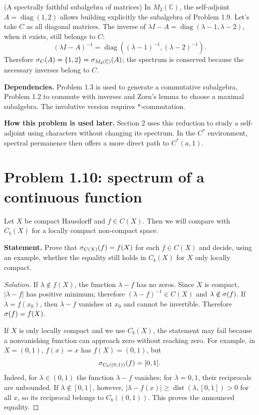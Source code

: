 \begin{cthejemplo}{(A spectrally faithful subalgebra of matrices)}
In $M_2(\mathbb C)$, the self-adjoint $A=\operatorname{diag}(1,2)$ allows building
explicitly the subalgebra of Problem 1.9.
Let's take $C$ as all diagonal matrices. The inverse of
$\lambda I-A=\operatorname{diag}(\lambda-1,\lambda-2)$, when it exists, still belongs to $C$:
\[
 (\lambda I-A)^{-1}=\operatorname{diag}((\lambda-1)^{-1},(\lambda-2)^{-1}).
\]
Therefore $\sigma_C(A)=\{1,2\}=\sigma_{M_2(\mathbb C)}(A)$; the spectrum is conserved because
the necessary inverses belong to $C$.
\end{cthejemplo}

\noindent\textbf{Dependencies.} Problem 1.3 is used to generate a commutative subalgebra, Problem 1.2 to commute with inverses and Zorn's lemma to choose a maximal subalgebra. The involutive version requires $*$-commutation.

\noindent\textbf{How this problem is used later.} Section 2 uses this reduction to study a self-adjoint using characters without changing its spectrum. In the $C^*$ environment, spectral permanence then offers a more direct path to $C^*(a,1)$.

\pagebreak
\section{Problem 1.10: spectrum of a continuous function}

Let $X$ be compact Hausdorff and $f\in C(X)$. Then we will compare with $C_b(X)$ for a locally compact non-compact space.

\noindent\textbf{Statement.} Prove that $\sigma_{C(X)}(f)=f(X)$ for each $f\in C(X)$ and decide, using an example, whether the equality still holds in $C_b(X)$ for $X$ only locally compact.

\begin{proof}[Solution]
If $\lambda\notin f(X)$, the function $\lambda-f$ has no zeros. Since $X$ is compact,
$|\lambda-f|$ has positive minimum; therefore
$(\lambda-f)^{-1}\in C(X)$ and $\lambda\notin\sigma(f)$. If $\lambda=f(x_0)$, then
$\lambda-f$ vanishes at $x_0$ and cannot be invertible. Therefore $\sigma(f)=f(X)$.

If $X$ is only locally compact and we use $C_b(X)$, the statement may fail because a nonvanishing function can approach zero without reaching zero. For example, in $X=(0,1)$, $f(x)=x$ has
$f(X)=(0,1)$, but
\[
 \sigma_{C_b((0,1))}(f)=[0,1].
\]
Indeed, for $\lambda\in(0,1)$ the function $\lambda-f$ vanishes; for $\lambda=0,1$,
their reciprocals are unbounded. If $\lambda\notin[0,1]$, however,
$|\lambda-f(x)|\ge\operatorname{dist}(\lambda,[0,1])>0$ for all $x$, so its reciprocal belongs to $C_b((0,1))$. This proves the announced equality.
\end{proof}

